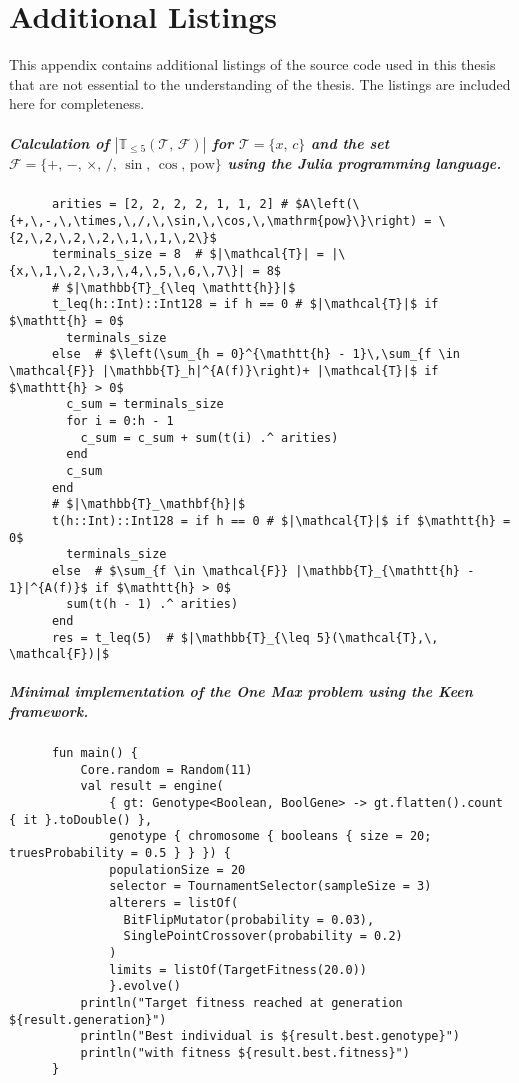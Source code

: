 \chapter{Additional Listings}
\label{app:Listings}
  This appendix contains additional listings of the source code used in this
  thesis that are not essential to the understanding of the thesis.
  The listings are included here for completeness.
  
  \paragraph{
    Calculation of \(|\mathbb{T}_{\leq 5}(\mathcal{T},\, \mathcal{F})|\) for 
    \(\mathcal{T} = \{x,\, c\}\) and the set \(\mathcal{F} = \{+,\, -,\, 
    \times,\, /,\, \sin,\, \cos,\, \mathrm{pow}\}\) using the \textit{Julia}
    programming language.
  }
  \label{lst:cardinality_of_T_leq_5}
    \begin{verbatim}
      arities = [2, 2, 2, 2, 1, 1, 2] # $A\left(\{+,\,-,\,\times,\,/,\,\sin,\,\cos,\,\mathrm{pow}\}\right) = \{2,\,2,\,2,\,2,\,1,\,1,\,2\}$
      terminals_size = 8  # $|\mathcal{T}| = |\{x,\,1,\,2,\,3,\,4,\,5,\,6,\,7\}| = 8$
      # $|\mathbb{T}_{\leq \mathtt{h}}|$
      t_leq(h::Int)::Int128 = if h == 0 # $|\mathcal{T}|$ if $\mathtt{h} = 0$
        terminals_size
      else  # $\left(\sum_{h = 0}^{\mathtt{h} - 1}\,\sum_{f \in \mathcal{F}} |\mathbb{T}_h|^{A(f)}\right)+ |\mathcal{T}|$ if $\mathtt{h} > 0$
        c_sum = terminals_size
        for i = 0:h - 1
          c_sum = c_sum + sum(t(i) .^ arities)
        end
        c_sum
      end
      # $|\mathbb{T}_\mathbf{h}|$
      t(h::Int)::Int128 = if h == 0 # $|\mathcal{T}|$ if $\mathtt{h} = 0$
        terminals_size
      else  # $\sum_{f \in \mathcal{F}} |\mathbb{T}_{\mathtt{h} - 1}|^{A(f)}$ if $\mathtt{h} > 0$
        sum(t(h - 1) .^ arities) 
      end
      res = t_leq(5)  # $|\mathbb{T}_{\leq 5}(\mathcal{T},\, \mathcal{F})|$
    \end{verbatim}
  \paragraph{
    Minimal implementation of the \textit{One Max} problem using the 
    \textit{Keen} framework.
  }
  \label{lst:app:keen_one_max}
    \begin{verbatim}
      fun main() {
          Core.random = Random(11)
          val result = engine(
              { gt: Genotype<Boolean, BoolGene> -> gt.flatten().count { it }.toDouble() },
              genotype { chromosome { booleans { size = 20; truesProbability = 0.5 } } }) {
              populationSize = 20
              selector = TournamentSelector(sampleSize = 3)
              alterers = listOf(
                BitFlipMutator(probability = 0.03),
                SinglePointCrossover(probability = 0.2)
              )
              limits = listOf(TargetFitness(20.0))
              }.evolve()
          println("Target fitness reached at generation ${result.generation}")
          println("Best individual is ${result.best.genotype}")
          println("with fitness ${result.best.fitness}")
      }
    \end{verbatim}

